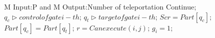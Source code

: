 \begin{algorithm}
{
\fontsize{9}{1}
\caption{The algorithm converts quantum circuit to bigraph}
\begin{algorithmic}[1]

 {M}    
 \State Input:P and M
 \State Output:Number of teleportation
      \State Continue;
      \EndIf
     \EndIf
 \State $q_{c} \triangleright control of gate i-th$;
 \State $q_{t} \triangleright target of gate i-th$;
 \State $Scr=Part[q_{c}];$
 \State $Part[q_{c}]=Part[q_{t}]$; 
  \State $r=Canexecute(i,j)$;
     \State  $g_{i}=1$;
   \EndIf
  \EndFor
 \EndFor
\EndFunction
\end{algorithmic}
}
\end{algorithm}